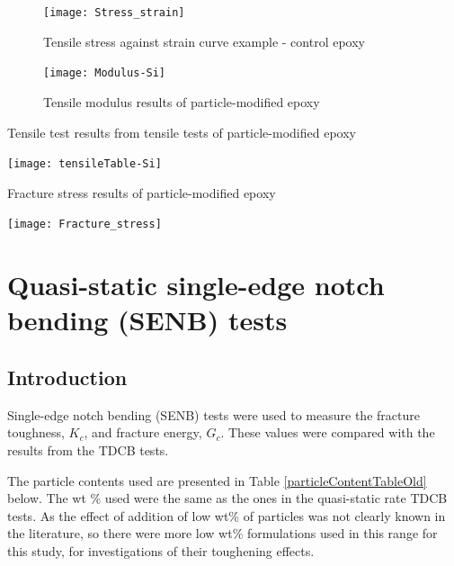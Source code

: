 \documentclass[numbers=noendperiod,chapterprefix=on]{icldt} %
\begin{document}
\begin{figure}[!htpb]
\centering
\texttt{[image: Stress\_strain]}
\caption{Tensile stress against strain curve example - control epoxy} \label{Stress_strain}
\end{figure}
\FloatBarrier


\begin{figure}[!htpb]
\centering
\texttt{[image: Modulus-Si]}
\caption{Tensile modulus results of particle-modified epoxy } \label{Modulus-Si}
\end{figure}
\FloatBarrier

\begin{table}[!htpb]
\centering
\caption{Tensile test results from tensile tests of particle-modified epoxy} \label{tensileTable-Si}
\texttt{[image: tensileTable-Si]}
\end{table}
\FloatBarrier

\begin{table}[!htpb]
\centering
\caption{Fracture stress results of particle-modified epoxy} \label{Fracture_stress}
\texttt{[image: Fracture\_stress]}
\end{table}
\FloatBarrier


\section{Quasi-static single-edge notch bending (SENB) tests} \label{SENB}
\subsection{Introduction}
Single-edge notch bending (SENB) tests were used to measure the fracture toughness, $K_c$, and fracture energy, $G_c$. These values were compared with the results from the TDCB tests. 


The particle contents used are presented in Table \ref{particleContentTableOld} below. The wt \% used were the same as the ones in the quasi-static rate TDCB tests. As the effect of addition of low wt\% of particles was not clearly known in the literature, so there were more low wt\% formulations used in this range for this study, for investigations of their toughening effects.   
\end{document}
